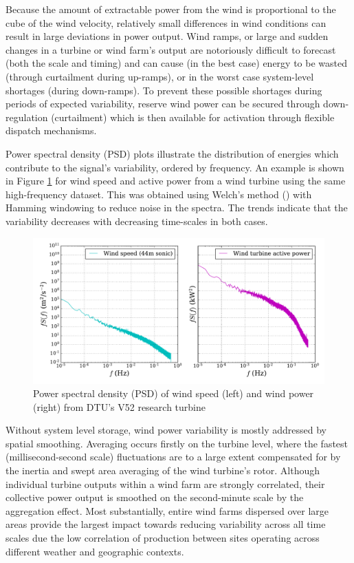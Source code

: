 Because the amount of extractable power from the wind is proportional to the cube of the wind velocity, relatively small differences in wind conditions can result in large deviations in power output. Wind ramps, or large and sudden changes in a turbine or wind farm's output are notoriously difficult to forecast (both the scale and timing) and can cause (in the best case) energy to be wasted (through curtailment during up-ramps), or in the worst case system-level shortages (during down-ramps). To prevent these possible shortages during periods of expected variability, reserve wind power can be secured through down-regulation (curtailment) which is then available for activation through flexible dispatch mechanisms.

Power spectral density (PSD) plots illustrate the distribution of energies which contribute to the signal's variability, ordered by frequency. An example is shown in Figure \ref{fig:wind_speed_power_psd} for wind speed and active power from a wind turbine using the same high-frequency dataset. This was obtained using Welch's method (\cite{welch_use_1967}) with Hamming windowing to reduce noise in the spectra. The trends indicate that the variability decreases with decreasing time-scales in both cases.

\begin{figure}[htbp]
    \centering
        \includegraphics[width=1.0\textwidth]{graphics/intro/variability/wind_speed_power_psd.pdf}
    \caption{Power spectral density (PSD) of wind speed (left) and wind power (right) from DTU's V52 research turbine}
    \label{fig:wind_speed_power_psd}
\end{figure}

Without system level storage, wind power variability is mostly addressed by spatial smoothing. Averaging occurs firstly on the turbine level, where the fastest (millisecond-second scale) fluctuations are to a large extent compensated for by the inertia and swept area averaging of the wind turbine's rotor. Although individual turbine outputs within a wind farm are strongly correlated, their collective power output is smoothed on the second-minute scale by the aggregation effect. Most substantially, entire wind farms dispersed over large areas provide the largest impact towards reducing variability across all time scales due the low correlation of production between sites operating across different weather and geographic contexts. 

